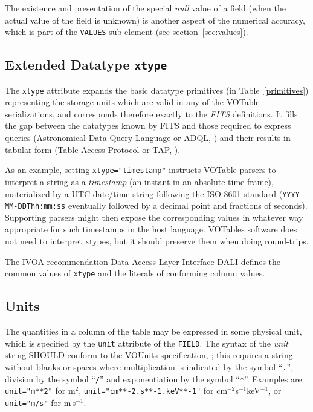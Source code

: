 \documentclass[11pt,a4paper]{ivoa}
\def\Aref#1{section~\ref{#1}}
\def\Tref#1{Table~\ref{#1}}
\let\fg=\color
\def\attr#1{{\tt{\fg{DarkRed}#1}}}
\def\elem#1{{\tt{\fg{DarkRed}#1}}}
\def\attrval#1#2{{\tt{\fg{DarkRed}#1}="{\fg{DarkPurple}#2}"}}
\begin{document}
The existence and presentation of the special {\em null} value of
a field (when the actual value of the field is unknown) is
another aspect of the numerical accuracy, which is part of the
\elem{VALUES} sub-element (see \Aref{sec:values}).

\subsection{Extended Datatype \attr{xtype}}
\label{sec:xtype}

The \attr{xtype} attribute expands the basic
datatype primitives (in \Tref{primitives})
representing the storage units which are valid in any of the
VOTable serializations,
and corresponds therefore exactly to the {\em FITS} definitions.
It fills the gap between the datatypes
known by FITS and those required to express queries
(Astronomical Data Query Language or ADQL, \citet{2008ivoa.spec.1030O})
and their results in tabular form (Table Access Protocol or TAP,
\citet{2010ivoa.spec.0327D}).

As an example, setting \attrval{xtype}{timestamp} instructs VOTable
parsers to interpret a string as a {\em  timestamp}
(an instant in an absolute time frame), materialized by a
UTC date/time string following the ISO-8601 standard
({\tt YYYY-MM-DDThh:mm:ss} eventually followed by a decimal point
and fractions of seconds).  Supporting parsers might then expose the
corresponding values in whatever way appropriate for such timestamps in
the host language.  VOTables software does not need to interpret xtypes,
but it should preserve them when doing round-trips.

The IVOA recommendation Data Access Layer Interface DALI
\citep{2017ivoa.spec.0517D} defines the common values of \attr{xtype}
and the literals of conforming column values.

\subsection{Units}
\label{sec:unit}

The quantities in a column of the table may be expressed in
some physical unit,
which is specified by the {\attr{unit}}
attribute of the {\elem{FIELD}}.
The syntax of the {\em unit} string SHOULD conform to
the VOUnits specification, \citet{2023ivoa.spec.1215G};
this requires a string without blanks or spaces
where multiplication is indicated by the symbol ``{\tt.}'',
division by the symbol ``{\tt/}''
and exponentiation by the symbol ``{\tt**}''.
Examples are \attrval{unit}{m**2} for m$^2$,
\attrval{unit}{cm**-2.s**-1.keV**-1} for cm$^{-2}$s$^{-1}$keV$^{-1}$,
or \attrval{unit}{m/s} for m\,s$^{-1}$.
\end{document}
